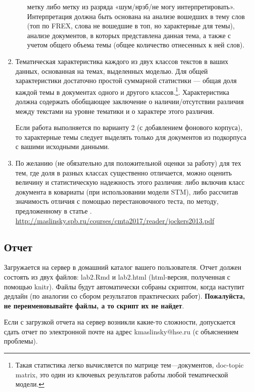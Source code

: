 \documentclass{report}
\begin{document}
\begin{enumerate}
\begin{itemize}
    метку либо метку из разряда «шум/нрзб/не могу
    интерпретировать». Интерпретация должна быть основана на анализе
    вошедших в тему слов (топ по FREX, слова не вошедшие в топ, но
    характерные для темы), анализе документов, в которых представлена
    данная тема, а также с учетом общего объема темы (общее количество
    отнесенных к ней слов).
  \end{itemize}
\item Тематическая характеристика каждого из двух классов текстов в
  ваших данных, основанная на темах, выделенных моделью. Для общей
  характеристики достаточно простой суммарной статистики — общая доля
  каждой темы в документах одного и другого классов.\footnote{Такая
    статистика легко вычисляется по матрице тем—документов, doc-topic
    matrix, это один из ключевых результатов работы любой тематической
    модели.}. Характеристика должна содержать обобщающее заключение о
  наличии/отсутствии различия между текстами на уровне тематики и о
  характере этого различия.

  Если работа выполняется по варианту 2 (с добавлением фонового
  корпуса), то характерные темы следует выделять только для документов
  из подкорпуса с вашими исходными данными.
\item По желанию (не обязательно для положительной оценки за
  работу) для тех тем, где доля в разных классах существенно
  отличается, можно оценить величину и статистическую надежность этого
  различия: либо включив класс документа в ковариаты (при
  использовании модели STM), либо рассчитав значимость отличия с
  помощью перестановочного теста, по методу, предложенному в статье
  . \url{http://maslinsky.spb.ru/courses/cmta2017/reader/jockers2013.pdf}
\end{enumerate}


\subsection{Отчет} 

Загружается на сервер в домашний каталог вашего пользователя. Отчет
должен состоять из двух файлов: lab2.Rmd и lab2.html (html-версия,
полученная с помощью knitr). Файлы будут автоматически собраны
скриптом, когда наступит дедлайн (по аналогии со сбором результатов
практических работ). \textbf{Пожалуйста, не переименовывайте
  файлы, а то скрипт их не найдет}. 

Если с загрузкой отчета на сервер возникли какие-то сложности,
допускается сдать отчет по электронной почте на адрес
kmaslinsky@hse.ru (с объяснением проблемы).
\end{document}
